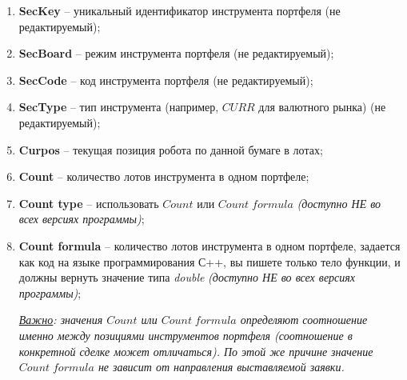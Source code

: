 \begin{enumerate}
	\item \textbf{SecKey} -- уникальный идентификатор инструмента портфеля (не редактируемый);
	\item \textbf{SecBoard} -- режим инструмента портфеля (не редактируемый);
	\item \textbf{SecCode} -- код инструмента портфеля (не редактируемый);
	\item \textbf{SecType} -- тип инструмента (например, $CURR$ для валютного рынка) (не редактируемый);
	\item \textbf{Curpos} -- текущая позиция робота по данной бумаге в лотах;%
	\item \textbf{Count} -- количество лотов инструмента в одном портфеле;
	\item \textbf{Count type} -- использовать $Count$ или $Count \; formula$ \textit{(доступно НЕ во всех версиях программы)};
	\item \textbf{Count formula} -- количество лотов инструмента в одном портфеле, задается как код на языке программирования С++, вы пишете только тело функции,
		и должны вернуть значение типа \textit{double} \textit{(доступно НЕ во всех версиях программы)};
		
		\textit{\underline{Важно}: значения $Count$ или $Count \; formula$ определяют соотношение именно между позициями инструментов портфеля (соотношение в конкретной
		сделке может отличаться). По этой же причине значение $Count \; formula$ не зависит от направления выставляемой заявки.}


\end{enumerate}
